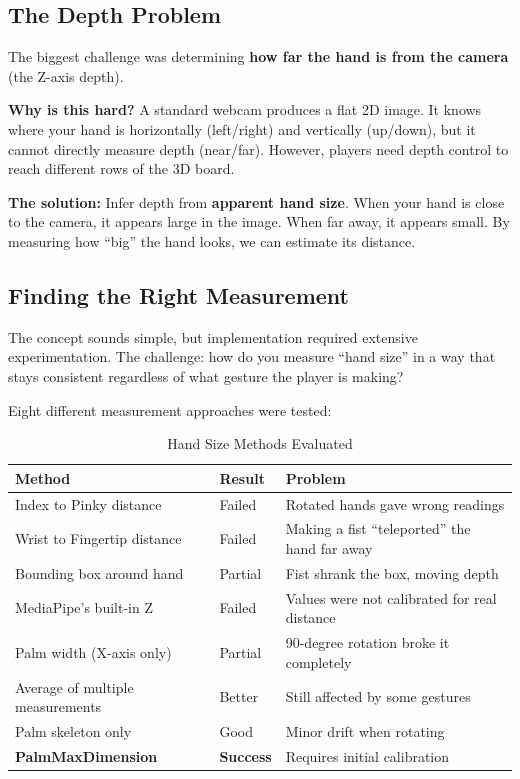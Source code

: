 \documentclass[11pt]{article}
\begin{document}
\subsection{The Depth Problem}

The biggest challenge was determining \textbf{how far the hand is from the camera} (the Z-axis depth).

\textbf{Why is this hard?} A standard webcam produces a flat 2D image. It knows where your hand is horizontally (left/right) and vertically (up/down), but it cannot directly measure depth (near/far). However, players need depth control to reach different rows of the 3D board.

\textbf{The solution:} Infer depth from \textbf{apparent hand size}. When your hand is close to the camera, it appears large in the image. When far away, it appears small. By measuring how ``big'' the hand looks, we can estimate its distance.


\subsection{Finding the Right Measurement}

The concept sounds simple, but implementation required extensive experimentation. The challenge: how do you measure ``hand size'' in a way that stays consistent regardless of what gesture the player is making?

Eight different measurement approaches were tested:

\begin{table}[H]
\centering
\caption{Hand Size Methods Evaluated}
\begin{tabular}{p{4cm}p{2cm}p{6cm}}
\toprule
\textbf{Method} & \textbf{Result} & \textbf{Problem} \\
\midrule
Index to Pinky distance & Failed & Rotated hands gave wrong readings \\
Wrist to Fingertip distance & Failed & Making a fist ``teleported'' the hand far away \\
Bounding box around hand & Partial & Fist shrank the box, moving depth \\
MediaPipe's built-in Z & Failed & Values were not calibrated for real distance \\
Palm width (X-axis only) & Partial & 90-degree rotation broke it completely \\
Average of multiple measurements & Better & Still affected by some gestures \\
Palm skeleton only & Good & Minor drift when rotating \\
\textbf{PalmMaxDimension} & \textbf{Success} & Requires initial calibration \\
\bottomrule
\end{tabular}
\end{table}
\end{document}
